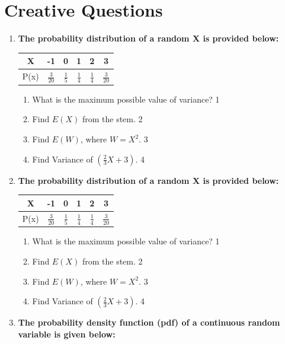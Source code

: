 \documentclass[a4paper,oneside]{book}
\begin{document}
\section{Creative Questions}
  \begin{enumerate}
  
   \item
	  \textbf{The probability distribution of a random X is provided below:} 
	  
	  \begin{table}[h]
	  \centering
\begin{tabular}{c|ccccc}
X & -1 & 0 & 1 & 2 & 3 \\ \hline
P(x) & $\frac 3{20}$ & $\frac 15$ & $\frac 14$ & $\frac 14$ & $\frac 3{20}$
\end{tabular}
\end{table}
  
  \begin{enumerate}
    \item
	What is the maximum possible value of variance? \hfill 1
    \item
	Find $E(X)$ from the stem. \hfill 2
    \item  
	Find $E(W)$, where $W = X^2$.  \hfill 3
    \item
	Find Variance of $(\frac 23 X+3)$. \hfill 4
  \end{enumerate}    
  \item
	  \textbf{The probability distribution of a random X is provided below:} 
	  
	  \begin{table}[h]
	  \centering
\begin{tabular}{c|ccccc}
X & -1 & 0 & 1 & 2 & 3 \\ \hline
P(x) & $\frac 3{20}$ & $\frac 15$ & $\frac 14$ & $\frac 14$ & $\frac 3{20}$
\end{tabular}
\end{table}
  
  \begin{enumerate}
    \item
	What is the maximum possible value of variance? \hfill 1
    \item
	Find $E(X)$ from the stem. \hfill 2
    \item  
	Find $E(W)$, where $W = X^2$.  \hfill 3
    \item
	Find Variance of $(\frac 23 X+3)$. \hfill 4
  \end{enumerate}   
  
         \item \textbf{The probability density function (pdf) of a continuous random variable is given below:}
	  

\end{enumerate}
\end{document}
